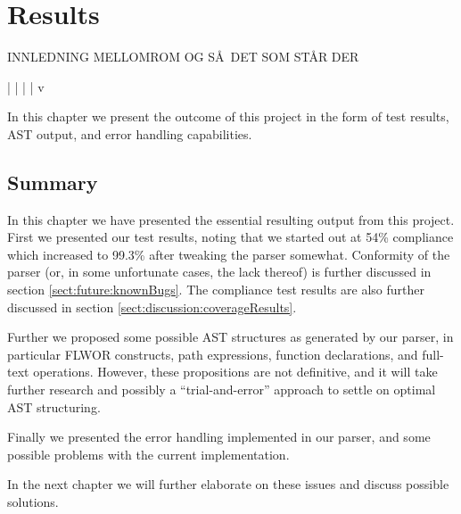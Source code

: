 \chapter{Results}
\label{chapter:results}

INNLEDNING
MELLOMROM
OG S\AA~DET SOM ST\AA R DER

|
|
|
|
v

In this chapter we present the outcome of this project in the form of test
results, AST output, and error handling capabilities.





\section{Summary}
In this chapter we have presented the essential resulting output from this
project. First we presented our test results, noting that we started out at   
54\% compliance which increased to 99.3\% after tweaking the parser somewhat.
Conformity of the parser (or, in some unfortunate cases, the lack thereof) is
further  discussed in section \ref{sect:future:knownBugs}. The compliance test
results are also further discussed in section
\ref{sect:discussion:coverageResults}.

Further we proposed some possible AST structures as generated by our parser, in
particular FLWOR constructs, path expressions, function declarations, and
full-text operations. However, these propositions are not definitive, and it
will take further research and possibly a ``trial-and-error'' approach to settle
on optimal AST structuring.

Finally we presented the error handling implemented in our parser, and some
possible problems with the current implementation. 

In the next chapter we will further elaborate on these issues and discuss
possible solutions.